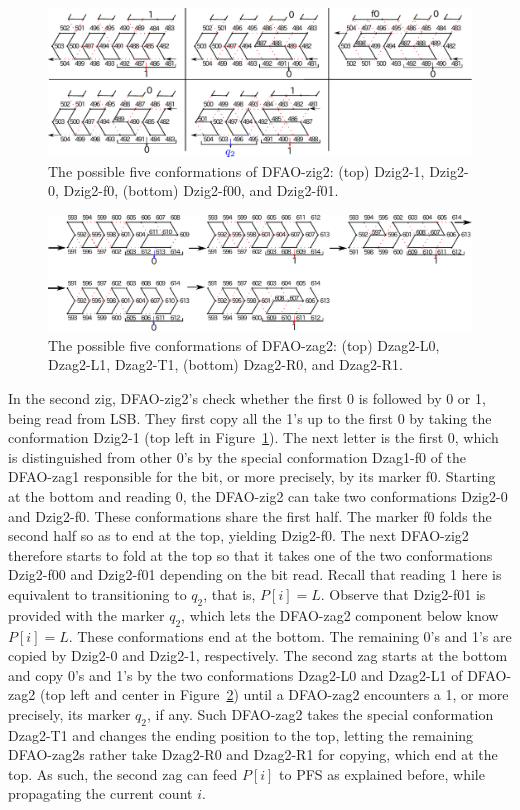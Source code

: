 \documentclass{article}
\theoremstyle{remark}
\begin{document}
\begin{figure}[h]
\centering
\includegraphics[width=\linewidth]{Dzig2.pdf}
  \caption{The possible five conformations of DFAO-zig2: (top) Dzig2-1, Dzig2-0, Dzig2-f0, (bottom) Dzig2-f00, and Dzig2-f01. }
  \label{fig:DFAO-zig2}
\end{figure} 

\begin{figure}[h]
\centering
\includegraphics[width=\linewidth]{Dzag2.pdf}
  \caption{The possible five conformations of DFAO-zag2: (top) Dzag2-L0, Dzag2-L1, Dzag2-T1, (bottom) Dzag2-R0, and Dzag2-R1.}
  \label{fig:DFAO-zag2}
  \end{figure} 

In the second zig, DFAO-zig2's check whether the first 0 is followed by 0 or 1, being read from LSB.
They first copy all the 1's up to the first 0 by taking the conformation Dzig2-1 (top left in Figure~\ref{fig:DFAO-zig2}).
The next letter is the first 0, which is distinguished from other 0's by the special conformation Dzag1-f0 of the DFAO-zag1 responsible for the bit, or more precisely, by its marker f0. 
Starting at the bottom and reading 0, the DFAO-zig2 can take two conformations Dzig2-0 and Dzig2-f0.
These conformations share the first half.
The marker f0 folds the second half so as to end at the top, yielding Dzig2-f0. 
The next DFAO-zig2 therefore starts to fold at the top so that it takes one of the two conformations Dzig2-f00 and Dzig2-f01 depending on the bit read.
Recall that reading 1 here is equivalent to transitioning to $q_2$, that is, $P[i] = L$.
Observe that Dzig2-f01 is provided with the marker $q_2$, which lets the DFAO-zag2 component below know $P[i] = L$. 
These conformations end at the bottom.
The remaining 0's and 1's are copied by Dzig2-0 and Dzig2-1, respectively.
The second zag starts at the bottom and copy 0's and 1's by the two conformations Dzag2-L0 and Dzag2-L1 of DFAO-zag2 (top left and center in Figure~\ref{fig:DFAO-zag2}) until a DFAO-zag2 encounters a 1, or more precisely, its marker $q_2$, if any. 
Such DFAO-zag2 takes the special conformation Dzag2-T1 and changes the ending position to the top, letting the remaining DFAO-zag2s rather take Dzag2-R0 and Dzag2-R1 for copying, which end at the top.
As such, the second zag can feed $P[i]$ to PFS as explained before, while propagating the current count $i$.
\end{document}
